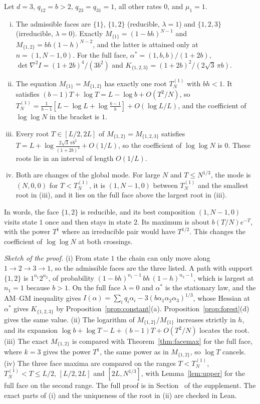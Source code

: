 \begin{proposition}\label{prop:threecycle}
Let $d=3$, $q_{12}=b>2$, $q_{23}=q_{31}=1$, all other rates $0$, and
$\mu_1=1$.
\begin{enumerate}[(i)]
\item The admissible faces are $\{1\}$, $\{1,2\}$ (reducible, $\lambda=1$) and
$\{1,2,3\}$ (irreducible, $\lambda=0$). Exactly
$M_{\{1\}}=(1-bh)^{N-1}$ and $M_{\{1,2\}}=bh(1-h)^{N-2}$, and the latter is
attained only at $n=(1,N-1,0)$. For the full face,
$\alpha^*=(1,b,b)/(1+2b)$, $\det\nabla^2I=(1+2b)^4/(3b^2)$ and
$K_{\{1,2,3\}}=(1+2b)^2/(2\sqrt3\,\pi b)$.
\item The equation $M_{\{1\}}=M_{\{1,2\}}$ has exactly one root $T^{(1)}_N$ with $bh<1$. It
satisfies $(b-1)T+\log T=L-\log b+O(T^2/N)$, so
$T^{(1)}_N=\frac1{b-1}[L-\log L+\log\frac{b-1}b]+O(\log L/L)$, and the
coefficient of $\log\log N$ in the bracket is $1$.
\item Every root $T\in[L/2,2L]$ of $M_{\{1,2\}}=M_{\{1,2,3\}}$ satisfies
$T=L+\log\frac{2\sqrt3\,\pi b^2}{(1+2b)^2}+O(1/L)$, so the coefficient of
$\log\log N$ is $0$. These roots lie in an interval of length $O(1/L)$.
\item Both are changes of the global mode. For large $N$ and $T\le N^{1/3}$,
the mode is $(N,0,0)$ for $T<T^{(1)}_N$, it is $(1,N-1,0)$ between
$T^{(1)}_N$ and the smallest root in (iii), and it lies on the full face above
the largest root in (iii).
\end{enumerate}
\end{proposition}

In words, the face $\{1,2\}$ is reducible, and its best composition
$(1,N-1,0)$ visits state $1$ once and then stays in state $2$. Its maximum is
about $b(T/N)e^{-T}$, with the power $T^1$ where an irreducible pair would have
$T^{1/2}$. This changes the coefficient of $\log\log N$ at both crossings.

\emph{Sketch of the proof.} (i) From state $1$ the chain can only move along
$1\to2\to3\to1$, so the admissible faces are the three listed. A path with support
$\{1,2\}$ is $1^{n_1}2^{n_2}$, of probability $(1-bh)^{n_1-1}\,bh\,(1-h)^{n_2-1}$, which is
largest at $n_1=1$ because $b>1$. On the full face $\lambda=0$ and $\alpha^*$ is the
stationary law, and the AM--GM inequality gives
$I(\alpha)=\sum_iq_i\alpha_i-3(b\alpha_1\alpha_2\alpha_3)^{1/3}$, whose Hessian at $\alpha^*$
gives $K_{\{1,2,3\}}$ by Proposition~\ref{prop:constant}(a). Proposition~\ref{prop:forest}(d)
gives the same value. (ii) The logarithm of $M_{\{1,2\}}/M_{\{1\}}$ increases strictly in
$h$, and its expansion $\log b+\log T-L+(b-1)T+O(T^2/N)$ locates the root. (iii) The exact
$M_{\{1,2\}}$ is compared with Theorem~\ref{thm:facemax} for the full face, where $k=3$
gives the power $T^1$, the same power as in $M_{\{1,2\}}$, so $\log T$ cancels. (iv) The
three face maxima are compared on the ranges $T<T^{(1)}_N$, $T^{(1)}_N<T\le L/2$,
$[L/2,2L]$ and $[2L,N^{1/3}]$, with Lemma~\ref{lem:upper} for the full face on the second
range. The full proof is in Section~ of the supplement. The exact
parts of (i) and the uniqueness of the root in (ii) are checked in Lean.


